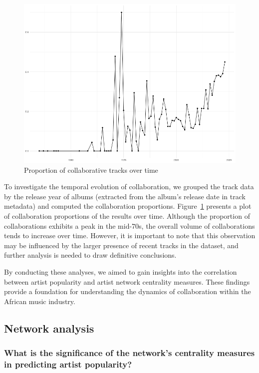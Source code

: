 \documentclass{article}
\begin{document}
\begin{figure}[H]
    \centering
    \includegraphics[width=\textwidth]{../data/figures/collaboration_proportions_by_time.png}
    \caption{Proportion of collaborative tracks over time}\label{fig:time_collab}
\end{figure}

To investigate the temporal evolution of collaboration, we grouped the track
data by the release year of albums (extracted from the album's release date in
track metadata) and computed the collaboration proportions. Figure\
\ref{fig:time_collab} presents a plot of collaboration proportions of the
results over time. Although the proportion of collaborations exhibits a peak in
the mid-70s, the overall volume of collaborations tends to increase over time.
However, it is important to note that this observation may be influenced by the
larger presence of recent tracks in the dataset, and further analysis is needed
to draw definitive conclusions.

By conducting these analyses, we aimed to gain insights into the correlation
between artist popularity and artist network centrality measures. These
findings provide a foundation for understanding the dynamics of collaboration
within the African music industry.

\subsection{Network analysis}

\subsubsection{What is the significance of the network’s centrality measures in predicting artist popularity?}
\end{document}
